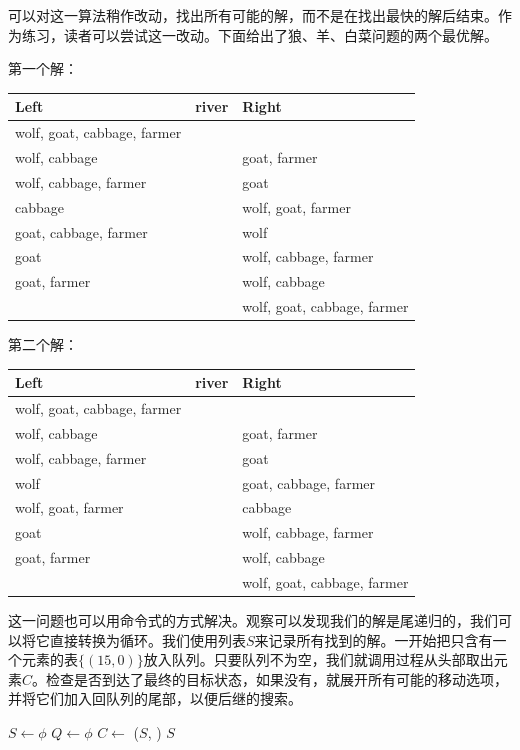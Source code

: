 \documentclass[UTF8]{article}
\begin{document}
可以对这一算法稍作改动，找出所有可能的解，而不是在找出最快的解后结束。作为练习，读者可以尝试这一改动。下面给出了狼、羊、白菜问题的两个最优解。

第一个解：

\begin{tabular}{l|c|l}
Left & river & Right \\
\hline
wolf, goat, cabbage, farmer &   & \\
wolf, cabbage &   & goat, farmer \\
wolf, cabbage, farmer &   & goat \\
cabbage &   & wolf, goat, farmer \\
goat, cabbage, farmer &   & wolf \\
goat &   & wolf, cabbage, farmer \\
goat, farmer &   & wolf, cabbage \\
 &  & wolf, goat, cabbage, farmer
\end{tabular}

第二个解：

\begin{tabular}{l|c|l}
Left & river & Right \\
\hline
 wolf, goat, cabbage, farmer & & \\
 wolf, cabbage & & goat, farmer \\
 wolf, cabbage, farmer & & goat \\
 wolf & & goat, cabbage, farmer \\
 wolf, goat, farmer & & cabbage \\
 goat & & wolf, cabbage, farmer \\
 goat, farmer & & wolf, cabbage \\
 & & wolf, goat, cabbage, farmer
\end{tabular}

这一问题也可以用命令式的方式解决。观察可以发现我们的解是尾递归的，我们可以将它直接转换为循环。我们使用列表$S$来记录所有找到的解。一开始把只含有一个元素的表$\{(15, 0)\}$放入队列。只要队列不为空，我们就调用过程从头部取出元素$C$。检查是否到达了最终的目标状态，如果没有，就展开所有可能的移动选项，并将它们加入回队列的尾部，以便后继的搜索。

\begin{algorithmic}[1]
  \State $S \gets \phi$
  \State $Q \gets \phi$
  \State {}
    \State $C \gets $ 
      \State {}($S$, )
    \Else
          \State {}
        \EndIf
      \EndFor
    \EndIf
  \EndWhile
  \State \Return $S$
\EndFunction
\end{algorithmic}
\end{document}
